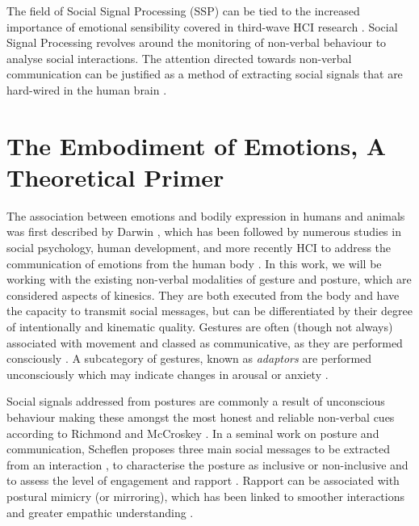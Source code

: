 The field of Social Signal Processing (SSP) can be tied to the increased importance of emotional sensibility covered in third-wave HCI research \cite{cristescu_emotions_2008}. Social Signal Processing revolves around the monitoring of non-verbal behaviour to analyse social interactions. The attention directed towards non-verbal communication can be justified as a method of extracting social signals that are hard-wired in the human brain \cite{vinciarelli_social_2009-1}.

\section{The Embodiment of Emotions, A Theoretical Primer}
\label{background:ebodiment_emotions}

The association between emotions and bodily expression in humans and animals was first described by Darwin \cite{darwin_expression_2013}, which has been followed by numerous studies in social psychology, human development, and more recently HCI \cite{alaoui_movement_2012, gillies_creating_2018, fdili_alaoui_strategies_2015} to address the communication of emotions from the human body \cite{gunes_lab_2008}. In this work, we will be working with the existing non-verbal modalities of gesture and posture, which are considered aspects of kinesics. They are both executed from the body and have the capacity to transmit social messages, but can be differentiated by their degree of intentionally and kinematic quality. Gestures are often (though not always) associated with movement and classed as communicative, as they are performed consciously \cite{vinciarelli_towards_2011}. A subcategory of gestures, known as \textit{adaptors} are performed unconsciously which may indicate changes in arousal or anxiety \cite{hans_kinesics_2015, neff_dont_2011}.

Social signals addressed from postures are commonly a result of unconscious behaviour making these amongst the most honest and reliable non-verbal cues according to Richmond and McCroskey \cite{richmond_nonverbal_2011}. In a seminal work on posture and communication, Scheflen proposes three main social messages to be extracted from an interaction \cite{scheflen_significance_1964}, to characterise the posture as inclusive or non-inclusive and to assess the level of engagement and rapport \cite{vinciarelli_social_2009}. Rapport can be associated with postural mimicry (or mirroring), which has been linked to smoother interactions and greater empathic understanding \cite{chartrand_chameleon_1999}.

